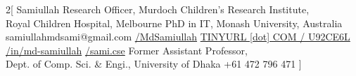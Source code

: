\documentclass{my_cv}
\begin{document}
\begin{multicols}{2}[
        {Samiullah}
        {Research Officer, Murdoch Children's Research Institute,\\\hspace{12pt} Royal Children Hospital, Melbourne}
        {PhD in IT, Monash University, Australia}
        {samiullahmdsami@gmail.com}
        {\href{https://github.com/MdSamiullah}{/MdSamiullah}}
        {\href{https://tinyurl.com/u92ce6l}{TINYURL [dot] COM / U92CE6L}}
        {\href{https://linkedin.com/in/md-samiullah}{{/in/md-samiullah}}}
        {\href{https://fb.com/sami.cse}{/sami.cse}}
        {Former Assistant Professor,\\\hspace{12pt} Dept. of Comp. Sci. \& Engi., University of Dhaka}
        {+61 472 796 471}
]
\end{multicols}

\end{document}
